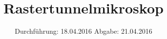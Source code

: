 


\subject{Versuchsprotokoll}
\title{Rastertunnelmikroskop}
\date{
  Durchführung: 18.04.2016
  \hspace{3em}
  Abgabe: 21.04.2016
}




\maketitle
\thispagestyle{empty}







\printbibliography


